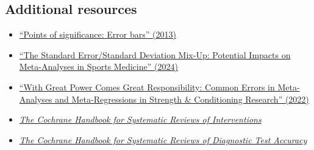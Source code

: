 \documentclass[letterpaper, 12pt]{article}
\begin{document}
\pagebreak

\subsection*{Additional resources}

\begin{itemize}
    \setlength\itemsep{-0.5em}
    \item \href{https://doi.org/10.1038/nmeth.2659}{``Points of significance: Error bars'' (2013)}
    \item \href{https://doi.org/10.1007/s40279-023-01989-9}{``The Standard Error/Standard Deviation Mix-Up: Potential Impacts on Meta-Analyses in Sports Medicine'' (2024)}
    \item \href{https://doi.org/10.1007/s40279-022-01766-0}{``With Great Power Comes Great Responsibility: Common Errors in Meta-Analyses and Meta-Regressions in Strength \& Conditioning Research'' (2022)}
    \item \href{https://training.cochrane.org/handbook/current/}{\textit{The Cochrane Handbook for Systematic Reviews of Interventions}}
    \item \href{https://training.cochrane.org/handbook-diagnostic-test-accuracy/current}{\textit{The Cochrane Handbook for Systematic Reviews of Diagnostic Test Accuracy}}

\end{itemize}

\end{document}
